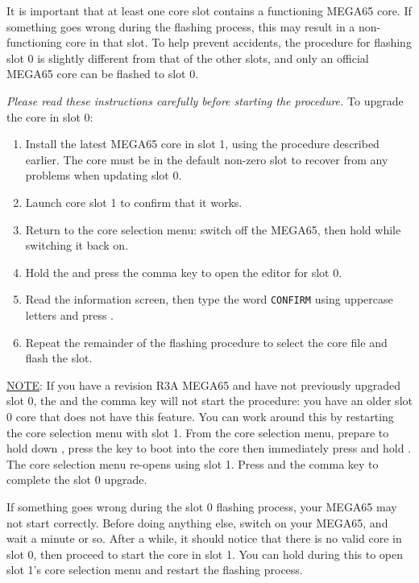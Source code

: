 It is important that at least one core slot contains a functioning MEGA65 core. If something goes wrong during the flashing process, this may result in a non-functioning core in that slot. To help prevent accidents, the procedure for flashing slot 0 is slightly different from that of the other slots, and only an official MEGA65 core can be flashed to slot 0.

{\em Please read these instructions carefully before starting the procedure.} To upgrade the core in slot 0:

\begin{enumerate}
  \item Install the latest MEGA65 core in slot 1, using the procedure described earlier. The core must be in the default non-zero slot to recover from any problems when updating slot 0.
  \item Launch core slot 1 to confirm that it works.
  \item Return to the core selection menu: switch off the MEGA65, then hold  while switching it back on.
  \item Hold the \megasymbolkey and press the comma key to open the editor for slot 0.
  \item Read the information screen, then type the word {\tt CONFIRM} using uppercase letters and press .
  \item Repeat the remainder of the flashing procedure to select the core file and flash the slot.
\end{enumerate}

\underline{NOTE}: If you have a revision R3A MEGA65 and have not previously upgraded slot 0, the \megasymbolkey and the comma key will not start the procedure: you have an older slot 0 core that does not have this feature. You can work around this by restarting the core selection menu with slot 1. From the core selection menu, prepare to hold down , press the  key to boot into the core then immediately press and hold . The core selection menu re-opens using slot 1. Press \megasymbolkey and the comma key to complete the slot 0 upgrade.

If something goes wrong during the slot 0 flashing process, your MEGA65 may not start correctly. Before doing anything else, switch on your MEGA65, and wait a minute or so. After a while, it should notice that there is no valid core in slot 0, then proceed to start the core in slot 1. You can hold  during this to open slot 1's core selection menu and restart the flashing process.

